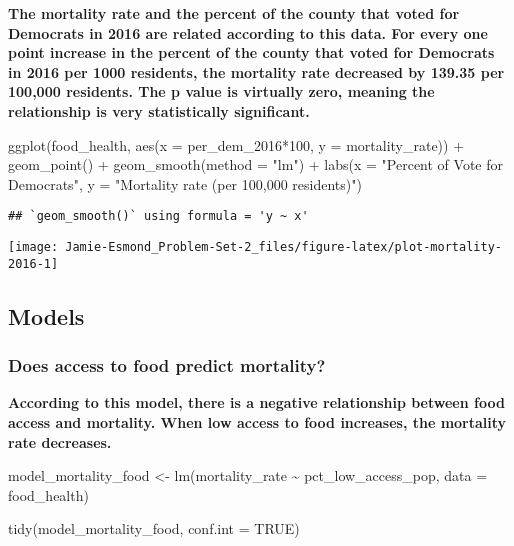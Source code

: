 \documentclass[
]{article}
\newenvironment{Shaded}{\begin{snugshade}}{\end{snugshade}}
\newcommand{\AttributeTok}[1]{\textcolor[rgb]{0.77,0.63,0.00}{#1}}
\newcommand{\ConstantTok}[1]{\textcolor[rgb]{0.00,0.00,0.00}{#1}}
\newcommand{\DecValTok}[1]{\textcolor[rgb]{0.00,0.00,0.81}{#1}}
\newcommand{\FunctionTok}[1]{\textcolor[rgb]{0.00,0.00,0.00}{#1}}
\newcommand{\NormalTok}[1]{#1}
\newcommand{\OtherTok}[1]{\textcolor[rgb]{0.56,0.35,0.01}{#1}}
\newcommand{\SpecialCharTok}[1]{\textcolor[rgb]{0.00,0.00,0.00}{#1}}
\newcommand{\StringTok}[1]{\textcolor[rgb]{0.31,0.60,0.02}{#1}}
\begin{document}
\textbf{The mortality rate and the percent of the county that voted for
Democrats in 2016 are related according to this data. For every one
point increase in the percent of the county that voted for Democrats in
2016 per 1000 residents, the mortality rate decreased by 139.35 per
100,000 residents. The p value is virtually zero, meaning the
relationship is very statistically significant. }

\begin{Shaded}
\begin{Highlighting}[]
\FunctionTok{ggplot}\NormalTok{(food\_health, }\FunctionTok{aes}\NormalTok{(}\AttributeTok{x =}\NormalTok{ per\_dem\_2016}\SpecialCharTok{*}\DecValTok{100}\NormalTok{, }\AttributeTok{y =}\NormalTok{ mortality\_rate)) }\SpecialCharTok{+}
  \FunctionTok{geom\_point}\NormalTok{() }\SpecialCharTok{+}
  \FunctionTok{geom\_smooth}\NormalTok{(}\AttributeTok{method =} \StringTok{"lm"}\NormalTok{) }\SpecialCharTok{+}
  \FunctionTok{labs}\NormalTok{(}\AttributeTok{x =} \StringTok{"Percent of Vote for Democrats"}\NormalTok{, }
       \AttributeTok{y =} \StringTok{"Mortality rate (per 100,000 residents)"}\NormalTok{)}
\end{Highlighting}
\end{Shaded}

\begin{verbatim}
## `geom_smooth()` using formula = 'y ~ x'
\end{verbatim}

\begin{center}\texttt{[image: Jamie-Esmond\_Problem-Set-2\_files/figure-latex/plot-mortality-2016-1]} \end{center}

\hypertarget{models-1}{%
\subsection{Models}\label{models-1}}

\hypertarget{does-access-to-food-predict-mortality}{%
\subsubsection{Does access to food predict
mortality?}\label{does-access-to-food-predict-mortality}}

\textbf{According to this model, there is a negative relationship
between food access and mortality. When low access to food increases,
the mortality rate decreases.}

\begin{Shaded}
\begin{Highlighting}[]
\NormalTok{model\_mortality\_food }\OtherTok{\textless{}{-}} \FunctionTok{lm}\NormalTok{(mortality\_rate }\SpecialCharTok{\textasciitilde{}}\NormalTok{ pct\_low\_access\_pop,}
                           \AttributeTok{data =}\NormalTok{ food\_health)}

\FunctionTok{tidy}\NormalTok{(model\_mortality\_food, }\AttributeTok{conf.int =} \ConstantTok{TRUE}\NormalTok{)}
\end{Highlighting}
\end{Shaded}
\end{document}
